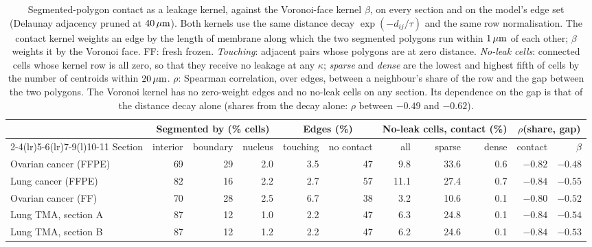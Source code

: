 \begin{table}[t]
\centering
\caption{Segmented-polygon contact as a leakage kernel, against the Voronoi-face kernel $\beta$, on every section and on the model's edge set (Delaunay adjacency pruned at $40\,\mu\text{m}$). Both kernels use the same distance decay $\exp(-d_{ij}/\tau)$ and the same row normalisation. The contact kernel weights an edge by the length of membrane along which the two segmented polygons run within $1\,\mu\text{m}$ of each other; $\beta$ weights it by the Voronoi face. FF: fresh frozen. \emph{Touching}: adjacent pairs whose polygons are at zero distance. \emph{No-leak cells}: connected cells whose kernel row is all zero, so that they receive no leakage at any $\kappa$; \emph{sparse} and \emph{dense} are the lowest and highest fifth of cells by the number of centroids within $20\,\mu\text{m}$. $\rho$: Spearman correlation, over edges, between a neighbour's share of the row and the gap between the two polygons. The Voronoi kernel has no zero-weight edges and no no-leak cells on any section. Its dependence on the gap is that of the distance decay alone (shares from the decay alone: $\rho$ between $-0.49$ and $-0.62$).}
\label{tab:contact}
\small
\setlength{\tabcolsep}{3.5pt}
\begin{tabular}{@{}lrrrrrrrrrr@{}}
\toprule
& \multicolumn{3}{c}{Segmented by (\% cells)} & \multicolumn{2}{c}{Edges (\%)} & \multicolumn{3}{c}{No-leak cells, contact (\%)} & \multicolumn{2}{c}{$\rho$(share, gap)} \\
\cmidrule(lr){2-4}\cmidrule(lr){5-6}\cmidrule(lr){7-9}\cmidrule(l){10-11}
Section & interior & boundary & nucleus & touching & no contact & all & sparse & dense & contact & $\beta$ \\
\midrule
Ovarian cancer (FFPE) & 69 & 29 & 2.0 & 3.5 & 47 & 9.8 & 33.6 & 0.6 & $-0.82$ & $-0.48$ \\
Lung cancer (FFPE) & 82 & 16 & 2.2 & 2.7 & 57 & 11.1 & 27.4 & 0.7 & $-0.84$ & $-0.55$ \\
Ovarian cancer (FF) & 70 & 28 & 2.5 & 6.7 & 38 & 3.2 & 10.6 & 0.1 & $-0.80$ & $-0.52$ \\
Lung TMA, section A & 87 & 12 & 1.0 & 2.2 & 47 & 6.3 & 24.8 & 0.1 & $-0.84$ & $-0.54$ \\
Lung TMA, section B & 87 & 12 & 1.2 & 2.2 & 47 & 6.2 & 24.6 & 0.1 & $-0.84$ & $-0.53$ \\
\bottomrule
\end{tabular}
\end{table}

